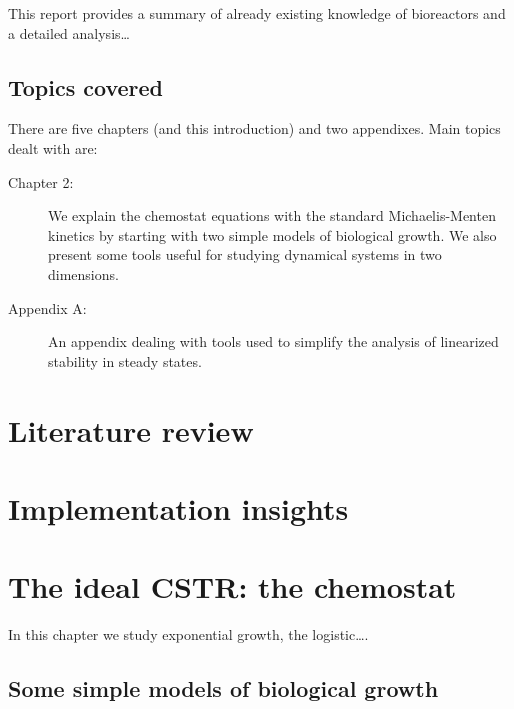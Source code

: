 \documentclass[a4paper, 10pt, twoside, openright]{book}
\begin{document}
This report provides a summary of already
existing knowledge of bioreactors and a detailed analysis\ldots


\section{Topics covered}
There are five chapters (and this introduction)
and two appendixes. Main topics dealt with are: 

\begin{description} 
\item[Chapter 2:]{We explain the chemostat equations with the standard
    Michaelis-Menten kinetics by starting with two simple models of
    biological growth. We also present some tools useful for studying
    dynamical systems in two dimensions.}   
\item[Appendix A:]{An appendix dealing with tools used to simplify the
    analysis of linearized stability in steady states.}
\end{description}

\fi



\chapter{Literature review}





\chapter{Implementation insights}
\chapter{The ideal CSTR: the chemostat}

\textsf{%
In this chapter we study exponential growth, the logistic\ldots .}

\section{Some simple models of biological growth}
\end{document}
